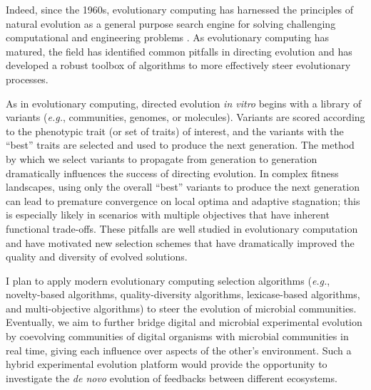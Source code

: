 Indeed, since the 1960s, evolutionary computing has harnessed the principles of natural evolution as a general purpose search engine for solving challenging computational and engineering problems \citep{back_handbook_1997}. 
As evolutionary computing has matured, the field has identified common pitfalls in directing evolution and has developed a robust toolbox of algorithms to more effectively steer evolutionary processes.

As in evolutionary computing, directed evolution \textit{in vitro} begins with a library of variants (\textit{e.g.}, communities, genomes, or molecules). 
Variants are scored according to the phenotypic trait (or set of traits) of interest, and the variants with the ``best'' traits are selected and used to produce the next generation.
The method by which we select variants to propagate from generation to generation dramatically influences the success of directing evolution. 
In complex fitness landscapes, using only the overall ``best'' variants to produce the next generation can lead to premature convergence on local optima and adaptive stagnation; 
this is especially likely in scenarios with multiple objectives that have inherent functional trade-offs.
These pitfalls are well studied in evolutionary computation and have motivated new selection schemes that have dramatically improved the quality and diversity of evolved solutions.

I plan to apply modern evolutionary computing selection algorithms (\textit{e.g.}, novelty-based algorithms, quality-diversity algorithms, lexicase-based algorithms, and multi-objective algorithms) to steer the evolution of microbial communities.
Eventually, we aim to further bridge digital and microbial experimental evolution by coevolving communities of digital organisms with microbial communities in real time, giving each influence over aspects of the other's environment.
Such a hybrid experimental evolution platform would provide the opportunity to investigate the \textit{de novo} evolution of feedbacks between different ecosystems.